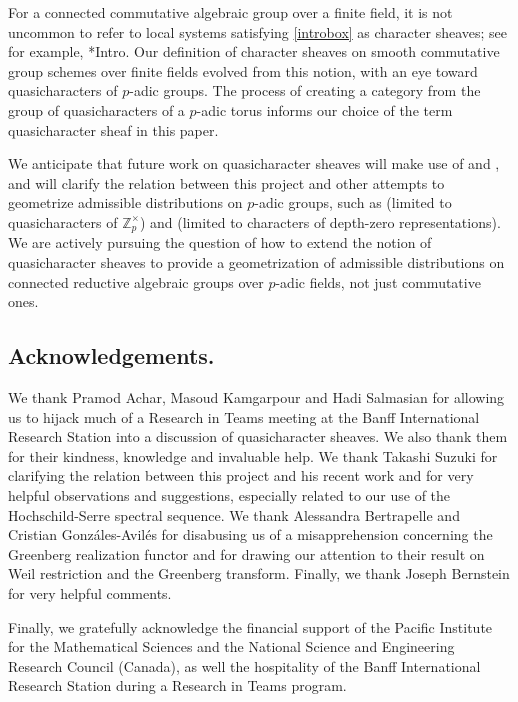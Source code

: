 \documentclass[10pt]{amsart}
\theoremstyle{plain}
\theoremstyle{definition}
\newcommand{\ZZ}{{\mathbb{Z}}}
\begin{document}
For a connected commutative algebraic group over a finite field, it is not uncommon to refer to
local systems satisfying \eqref{introbox}  as character sheaves; see for example, \cite{kamgarpour:09a}*{Intro}.
Our definition of character sheaves on smooth commutative group schemes over finite fields evolved from this notion,
with an eye toward quasicharacters of $p$-adic groups.
The process of creating a category from the group of quasicharacters of a $p$-adic torus informs our choice of the
term quasicharacter sheaf in this paper.

We anticipate that future work on quasicharacter sheaves will make use of   \cite{suzuki-yoshida:12a} and \cite{suzuki:14a},
and will clarify the relation between this project and other attempts to geometrize admissible distributions on $p$-adic groups,
such as \cite{cunningham-kamgarpour:13a} (limited to quasicharacters of $\ZZ_p^\times$) and \cite{aubert-cunningham:02a}
(limited to characters of depth-zero representations). 
We are actively pursuing the question of how to extend the notion of quasicharacter sheaves to provide a geometrization
of admissible distributions on connected reductive algebraic groups over $p$-adic fields, not just commutative ones.

\subsection*{Acknowledgements.}

We thank Pramod Achar, Masoud Kamgarpour and Hadi Salmasian for 
allowing us to hijack much of a Research in Teams meeting at the Banff International Research Station into a discussion of
quasicharacter sheaves.  We also thank them for their kindness, knowledge and invaluable help.
We thank Takashi Suzuki for clarifying the relation between this project and his recent work and for very helpful
observations and suggestions, especially related to our use of the Hochschild-Serre spectral sequence.
We thank Alessandra Bertrapelle and Cristian Gonz\'ales-Avil\'es for disabusing us of a misapprehension concerning
the Greenberg realization functor and for drawing our attention to their result on Weil restriction and the Greenberg transform.
Finally, we thank Joseph Bernstein for very helpful comments.

Finally, we gratefully acknowledge the financial support of the Pacific Institute for the Mathematical Sciences
and the National Science and Engineering Research Council (Canada), as well the hospitality of the
Banff International Research Station during a Research in Teams program.
\end{document}
